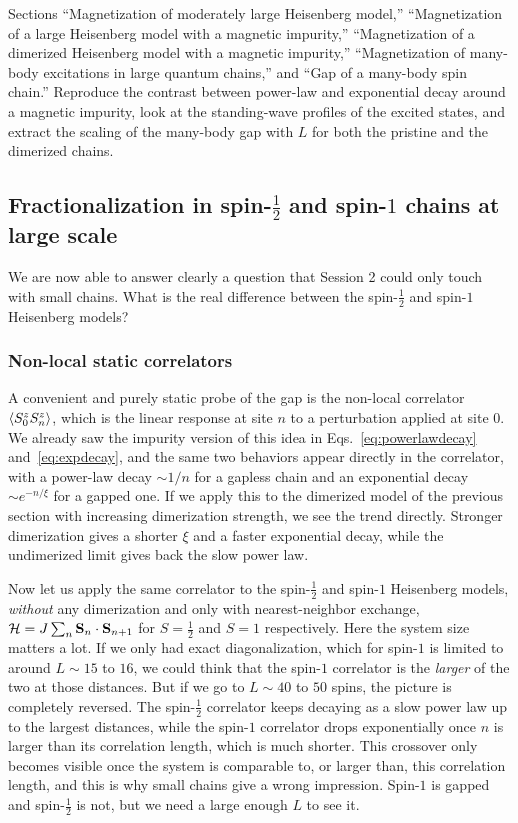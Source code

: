 \documentclass[lecture_notes.tex]{subfiles}
\begin{document}
\begin{notebook}
Sections ``Magnetization of moderately large Heisenberg model,'' ``Magnetization of a large
Heisenberg model with a magnetic impurity,'' ``Magnetization of a dimerized Heisenberg model with
a magnetic impurity,'' ``Magnetization of many-body excitations in large quantum chains,'' and
``Gap of a many-body spin chain.'' Reproduce the contrast between power-law and exponential decay
around a magnetic impurity, look at the standing-wave profiles of the excited states, and extract
the scaling of the many-body gap with $L$ for both the pristine and the dimerized chains.
\end{notebook}

\subsection{Fractionalization in spin-$\tfrac12$ and spin-$1$ chains at large scale}
\label{sec:fractionalization}
We are now able to answer clearly a question that Session 2 could only touch with small chains.
What is the real difference between the spin-$\tfrac12$ and spin-$1$ Heisenberg models?

\subsubsection{Non-local static correlators}
A convenient and purely static probe of the gap is the non-local correlator
$\expval{S_0^z S_n^z}$, which is the linear response at site $n$ to a perturbation applied at site
$0$. We already saw the impurity version of this idea in Eqs.~\eqref{eq:powerlawdecay}
and~\eqref{eq:expdecay}, and the same two behaviors appear directly in the correlator, with a
power-law decay $\sim 1/n$ for a gapless chain and an exponential decay $\sim e^{-n/\xi}$ for a
gapped one. If we apply this to the dimerized model of the previous section with increasing
dimerization strength, we see the trend directly. Stronger dimerization gives a shorter $\xi$ and
a faster exponential decay, while the undimerized limit gives back the slow power law.

Now let us apply the same correlator to the spin-$\tfrac12$ and spin-$1$ Heisenberg models,
\emph{without} any dimerization and only with nearest-neighbor exchange, $\mathcal{H} =
J\sum_n \vb S_n\cdot\vb S_{n+1}$ for $S=\tfrac12$ and $S=1$ respectively. Here the system size
matters a lot. If we only had exact diagonalization, which for spin-$1$ is limited to around
$L\sim15$ to $16$, we could think that the spin-$1$ correlator is the \emph{larger} of the two at
those distances. But if we go to $L\sim 40$ to $50$ spins, the picture is completely reversed. The
spin-$\tfrac12$ correlator keeps decaying as a slow power law up to the largest distances, while
the spin-$1$ correlator drops exponentially once $n$ is larger than its correlation length, which
is much shorter. This crossover only becomes visible once the system is comparable to, or larger
than, this correlation length, and this is why small chains give a wrong impression. Spin-$1$ is
gapped and spin-$\tfrac12$ is not, but we need a large enough $L$ to see it.
\end{document}
